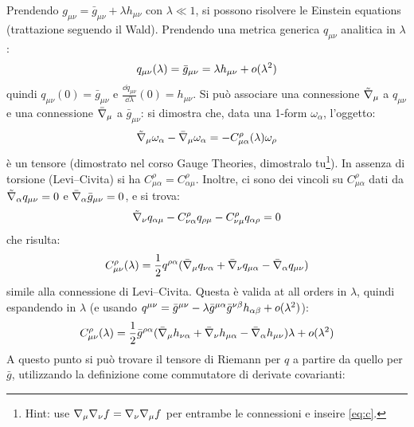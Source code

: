 Prendendo $ g_{\mu \nu} = \bar{g}_{\mu \nu} + \lambda h_{\mu \nu} $ con $ \lambda \ll 1 $, si possono risolvere le Einstein equations (trattazione seguendo il Wald). Prendendo una metrica generica $ q_{\mu \nu} $ analitica in $ \lambda $:
\begin{equation*}
  q_{\mu \nu}(\lambda) = \bar{g}_{\mu \nu} = \lambda h_{\mu \nu} + o(\lambda^2)
\end{equation*}
quindi $ q_{\mu \nu}(0) = \bar{g}_{\mu \nu} $ e $ \frac{\dd q_{\mu \nu}}{\dd \lambda}(0) = h_{\mu \nu} $. Si può associare una connessione $ \tilde{\nabla}_\mu $ a $ q_{\mu \nu} $ e una connessione $ \bar{\nabla}_\mu $ a $ \bar{g}_{\mu \nu} $: si dimostra che, data una 1-form $ \omega_\alpha $, l'oggetto:
\begin{equation}
  \tilde{\nabla}_\mu \omega_\alpha - \bar{\nabla}_\mu \omega_\alpha = - C_{\mu \alpha}^\rho(\lambda) \omega_\rho
  \label{eq:c}
\end{equation}
è un tensore (dimostrato nel corso Gauge Theories, dimostralo tu\footnote{Hint: use $ \nabla_\mu \nabla_\nu f = \nabla_\nu \nabla_\mu f $ per entrambe le connessioni e inseire \ref{eq:c}.}). In assenza di torsione (Levi--Civita) si ha $ C_{\mu \alpha}^\rho = C_{\alpha \mu}^\rho $. Inoltre, ci sono dei vincoli su $ C_{\mu \alpha}^\rho $ dati da $ \tilde{\nabla}_\alpha q_{\mu \nu} = 0 $ e $ \bar{\nabla}_\alpha \bar{g}_{\mu \nu} = 0 $, e si trova:
\begin{equation*}
  \tilde{\nabla}_\nu q_{\alpha \mu} - C_{\nu \alpha}^\rho q_{\rho \mu} - C_{\nu \mu}^\rho q_{\alpha \rho} = 0
\end{equation*}
che risulta:
\begin{equation}
  C_{\mu \nu}^\rho(\lambda) = \frac{1}{2} q^{\rho \alpha} (\bar{\nabla}_\mu q_{\nu \alpha} + \bar{\nabla}_\nu q_{\mu \alpha} - \bar{\nabla}_\alpha q_{\mu \nu})
\end{equation}
simile alla connessione di Levi--Civita. Questa è valida at all orders in $ \lambda $, quindi espandendo in $ \lambda $ (e usando $ q^{\mu \nu} = \bar{g}^{\mu \nu} - \lambda \bar{g}^{\mu \alpha} \bar{g}^{\nu \beta} h_{\alpha \beta} + o(\lambda^2) $):
\begin{equation*}
  C_{\mu \nu}^\rho(\lambda) = \frac{1}{2} \bar{g}^{\rho \alpha} (\bar{\nabla}_\mu h_{\nu \alpha} + \bar{\nabla}_\nu h_{\mu \alpha} - \bar{\nabla}_\alpha h_{\mu \nu}) \lambda + o(\lambda^2)
\end{equation*}
A questo punto si può trovare il tensore di Riemann per $ q $ a partire da quello per $ \bar{g} $, utilizzando la definizione come commutatore di derivate covarianti:
